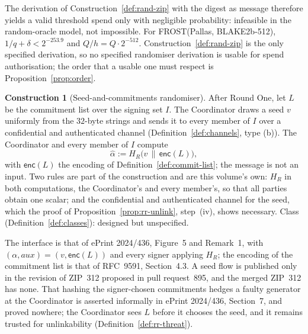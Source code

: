 \documentclass[11pt,a4paper]{article}
\theoremstyle{definition}
\newtheorem{construction}[theorem]{Construction}
\begin{document}
The derivation of Construction~\ref{def:rand-zip} with the digest as
message therefore yields a valid threshold spend only with negligible
probability: infeasible in the random-oracle model, not impossible. For
FROST(Pallas, BLAKE2b-512), \(1/q + \delta < 2^{-253.9}\) and
\(Q/h = Q \cdot 2^{-512}\). Construction~\ref{def:rand-zip} is the only
specified derivation, so no specified randomiser derivation is usable for
spend authorisation; the order that a usable one must respect is
Proposition~\ref{prop:order}.

\begin{construction}[Seed-and-commitments randomiser]\label{def:rand-seed}
After Round One, let \(L\) be the commitment list over the signing set
\(I\). The Coordinator draws a seed \(v\) uniformly from the \(32\)-byte
strings and sends it to every member of \(I\) over a confidential and
authenticated channel (Definition~\ref{def:channels}, type (b)). The
Coordinator and every member of \(I\) compute
\[
  \hat{\alpha} := H_R\bigl(v \,\|\, \mathsf{enc}(L)\bigr) ,
\]
with \(\mathsf{enc}(L)\) the encoding of Definition~\ref{def:commit-list};
the message is not an input. Two rules are part of the construction and are this
volume's own: \(H_R\) in both computations, the Coordinator's and every
member's, so that all parties obtain one scalar; and the confidential and
authenticated channel for the seed, which the proof of
Proposition~\ref{prop:rr-unlink}, step~(iv), shows necessary. Class
(Definition~\ref{def:classes}): designed but unspecified.
\end{construction}

The interface is that of ePrint 2024/436, Figure~5 and Remark~1, with
\((\alpha, \mathit{aux}) = (v, \mathsf{enc}(L))\) and every signer applying
\(H_R\); the encoding of the commitment list is that of RFC~9591,
Section~4.3. A seed flow is published only in the revision of ZIP~312
proposed in pull request~895, and the merged ZIP~312 has none. That hashing the
signer-chosen
commitments hedges a faulty generator at the Coordinator is asserted
informally in ePrint 2024/436, Section~7, and proved nowhere; the
Coordinator sees \(L\) before it chooses the seed, and it remains trusted
for unlinkability (Definition~\ref{def:rr-threat}).
\end{document}
